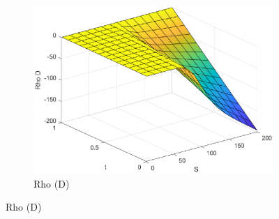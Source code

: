 \begin{figure}[H]
\begin{subfigure}[b]{0.35\linewidth}
        \includegraphics[width=\linewidth]{Imagenes/6_Sols/Call/Call_Rho_D.eps}
        \caption{Rho (D)}
    \end{subfigure}
\end{figure}


